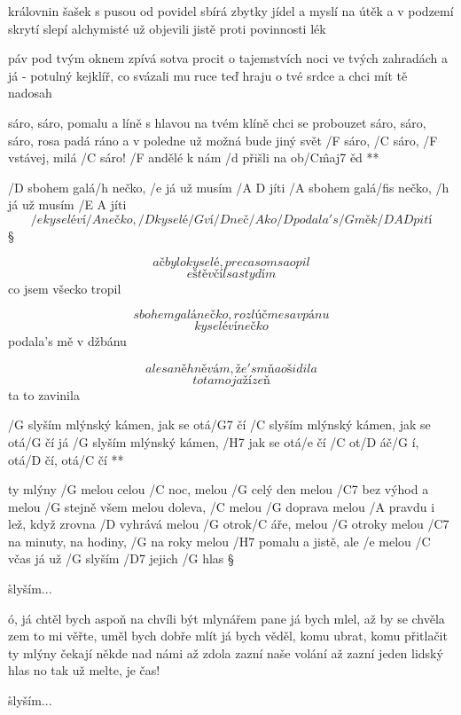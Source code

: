 královnin šašek s pusou od povidel
sbírá zbytky jídel a myslí na útěk
a v podzemí skrytí slepí alchymisté
už objevili jistě proti povinnosti lék

\rr

páv pod tvým oknem zpívá sotva procit
o tajemstvích noci ve tvých zahradách
a já - potulný kejklíř, co svázali mu ruce
teď hraju o tvé srdce a chci mít tě nadosah

\R  sáro, sáro, pomalu a líně
    s hlavou na tvém klíně chci se probouzet
    sáro, sáro, sáro, rosa padá ráno
    a v poledne už možná bude jiný svět
    /F sáro, /C sáro, /F vstávej, milá /C sáro!
    /F andělé k nám /d přišli na ob/C\^{maj7} ěd **




/D sbohem galá/h nečko, /e já už musím /{A D} jíti
/A sbohem galá/fis nečko, /h já už musím /{E A} jíti
\[ /e kyselé ví/A nečko, /D kyselé /G ví/D neč/A ko
/D podala's /G mě k /{D A D} pití \]\S

\[ ač bylo kyselé, preca som sa opil \]
\[ eště včíl sa stydím \]
co jsem všecko tropil \s

\[ sbohem galánečko, rozlúčme sa v pánu \]
\[ kyselé vínečko \]
podala's mě v džbánu \s

\[ ale sa něhněvám, že's mňa ošidila \]
\[ to ta moja žízeň \]
ta to zavinila




\R /G slyším mlýnský kámen, jak se otá/G7 čí
   /C slyším mlýnský kámen, jak se otá/G čí
   já /G slyším mlýnský kámen, /H7 jak se otá/e čí
   /C ot/D áč/G í, otá/D čí, otá/C čí **

ty mlýny /G melou celou /C noc, melou /G celý den
melou /C7 bez výhod a melou /G stejně všem
melou doleva, /C melou /G doprava
melou /A pravdu i lež, když zrovna /D vyhrává
melou /G otrok/C áře, melou /G otroky
melou /C7 na minuty, na hodiny, /G na roky
melou /H7 pomalu a jistě, ale /e melou /C včas
já už /G slyším /D7 jejich /G hlas \S

\r slyším...

ó, já chtěl bych aspoň na chvíli být mlynářem
pane já bych mlel, až by se chvěla zem
to mi věřte, uměl bych dobře mlít
já bych věděl, komu ubrat, komu přitlačit
ty mlýny čekají někde nad námi
až zdola zazní naše volání
až zazní jeden lidský hlas
no tak už melte, je čas! \s

\r slyším...



